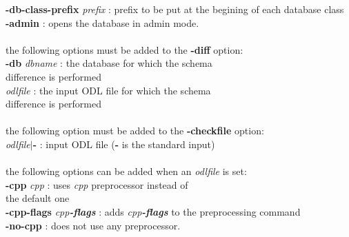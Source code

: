 \begin{tabbing}
{\bf -db-class-prefix} \emph{prefix}    \>: prefix to be put at the begining of each database class\\
{\bf -admin}                       \>: opens the database in admin mode.\\
\\
the following options must be added to the {\bf -diff} option:\\
{\bf -db} \emph{dbname}                 \>: the database for which the schema\\
                             \>\>  difference is performed\\
\emph{odlfile}                    \>: the input ODL file for which the schema\\
                               difference is performed\\
\\
the following option must be added to the {\bf -checkfile} option:\\
\emph{odlfile}$|${\bf -}                  \>: input ODL file ({\bf -} is the standard input)\\
\\
the following options can be added when an \emph{odlfile} is set:\\
{\bf -cpp} \emph{cpp}                   \>: uses \emph{cpp} preprocessor instead of\\
                             \>\> the default one\\
{\bf -cpp-flags} \emph{cpp{\bf -flags}}       \>: adds \emph{cpp{\bf -flags}} to the preprocessing command\\
{\bf -no-cpp}                      \>: does not use any preprocessor.
\end{tabbing}



